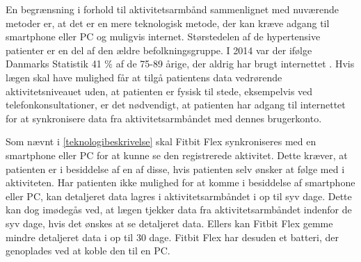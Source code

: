 En begrænsning i forhold til aktivitetsarmbånd sammenlignet med nuværende metoder er, at det er en mere teknologisk metode, der kan kræve adgang til smartphone eller PC og muligvis internet. Størstedelen af de hypertensive patienter er en del af den ældre befolkningsgruppe. I 2014 var der ifølge Danmarks Statistik 41 \% af de 75-89 årige, der aldrig har brugt internettet \citep{dst2014}. Hvis lægen skal have mulighed får at tilgå patientens data vedrørende aktivitetsniveauet uden, at patienten er fysisk til stede, eksempelvis ved telefonkonsultationer, er det nødvendigt, at patienten har adgang til internettet for at synkronisere data fra aktivitetsarmbåndet med dennes brugerkonto.

Som nævnt i \autoref{teknologibeskrivelse} skal Fitbit Flex synkroniseres med en smartphone eller PC for at kunne se den registrerede aktivitet. Dette kræver, at patienten er i besiddelse af en af disse, hvis patienten selv ønsker at følge med i aktiviteten. Har patienten ikke mulighed for at komme i besiddelse af smartphone eller PC, kan detaljeret data lagres i aktivitetsarmbåndet i op til syv dage. Dette kan dog imødegås ved, at lægen tjekker data fra aktivitetsarmbåndet indenfor de syv dage, hvis det ønskes at se detaljeret data. Ellers kan Fitbit Flex gemme mindre detaljeret data i op til 30 dage. Fitbit Flex har desuden et batteri, der genoplades ved at koble den til en PC. 
